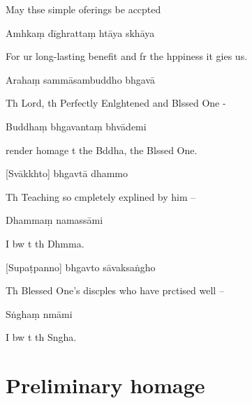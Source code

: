 \begin{english}
May thse simple oferings be accpted
\end{english}

Amhkaṃ dīghrattaṃ htāya skhāya

\begin{english}
For ur long-lasting benefit and fr the hppiness it gies us.
\end{english}

Arahaṃ sammāsambuddho bhgavā

\begin{english}
Th Lord, th Perfectly Enlghtened and Blssed One -
\end{english}

Buddhaṃ bhgavantaṃ bhvādemi

\begin{english}
 render homage t the Bddha, the Blssed One.
\end{english}


[Svākkhto] bhgavtā dhammo

\begin{english}
Th Teaching so cmpletely explined by him --
\end{english}

Dhammaṃ namassāmi

\begin{english}
I bw t th Dhmma.
\end{english}


[Supaṭpanno] bhgavto sāvaksaṅgho

\begin{english}
Th Blessed One's discples who have prctised well --
\end{english}

Sṅghaṃ nmāmi

\begin{english}
I bw t th Sngha.
\end{english}


\chapter[Namo Tassa]{Preliminary homage}

